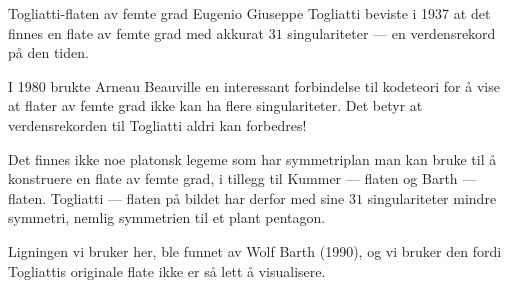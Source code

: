 \begin{surferPage}{Togliatti-flaten av femte grad}
Eugenio Giuseppe Togliatti beviste i 1937 at det finnes en flate av femte grad med akkurat $31$ singulariteter --- en verdensrekord på den tiden. 

I 1980 brukte Arneau Beauville en interessant forbindelse til kodeteori for å vise at flater av femte grad ikke kan ha flere singulariteter. Det betyr at verdensrekorden til Togliatti aldri kan forbedres! 
	
Det finnes ikke noe platonsk legeme som har symmetriplan man kan bruke til å konstruere en flate av femte grad, i tillegg til Kummer --- flaten og Barth ---flaten. Togliatti --- flaten på bildet har derfor med sine $31$ singulariteter mindre symmetri, nemlig symmetrien til et plant pentagon.  

Ligningen vi bruker her, ble funnet av Wolf Barth (1990), og vi bruker den fordi Togliattis originale flate ikke er så lett å visualisere.
\end{surferPage}